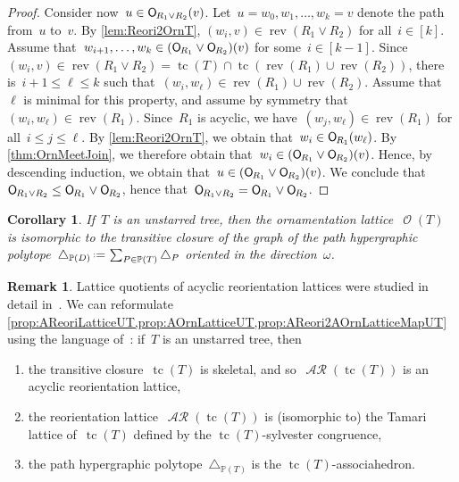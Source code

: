 \documentclass{amsart}
\newtheorem{corollary}[theorem]{Corollary}
\theoremstyle{definition}
\newtheorem{remark}[theorem]{Remark}
\renewcommand{\c}[1]{\mathcal{#1}} %
\newcommand{\eqdef}{\mbox{\,\raisebox{0.2ex}{\scriptsize\ensuremath{\mathrm:}}\ensuremath{=}\,}} %
\newcommand{\simplex}{\triangle} %
\DeclareMathOperator{\tc}{tc} %
\newcommand{\join}{\vee} %
\newcommand{\mymap}[2]{\mathsf{#1}_{\hspace{-.7pt}#2}}
\DeclareMathOperator{\Orn}{\c{O}}  %
\newcommand{\orn}[1]{\mymap{O}{#1}}  %
\DeclareMathOperator{\AReori}{\c{AR}}  %
\DeclareMathOperator{\rev}{rev} %
\newcommand{\PP}{\mathbb P} %
\begin{document}
\begin{proof}
Consider now~$u \in \orn{R_1 \join R_2}(v)$.
Let~$u = w_0, w_1, \dots, w_k = v$ denote the path from~$u$ to~$v$.
By \cref{lem:Reori2OrnT}, $(w_i, v) \in \rev(R_1 \join R_2)$ for all~$i \in [k]$.
Assume that~$w_{i+1}, \dots, w_k \in (\orn{R_1} \join \orn{R_2})(v)$ for some~$i \in [k-1]$.
Since~$(w_i, v) \in \rev(R_1 \join R_2) = \tc(T) \cap \tc(\rev(R_1) \cup \rev(R_2))$, there is~${i+1 \le \ell \le k}$ such that~$(w_i, w_\ell) \in \rev(R_1) \cup \rev(R_2)$.
Assume that~$\ell$ is minimal for this property, and assume by symmetry that~$(w_i, w_\ell) \in \rev(R_1)$.
Since~$R_1$ is acyclic, we have~$(w_j, w_\ell) \in \rev(R_1)$ for all~${i \le j \le \ell}$.
By \cref{lem:Reori2OrnT}, we obtain that~$w_i \in \orn{R_1}(w_\ell)$.
By \cref{thm:OrnMeetJoin}, we therefore obtain that~${w_i \in (\orn{R_1} \join \orn{R_2})(v)}$.
Hence, by descending induction, we obtain that~$u \in (\orn{R_1} \join \orn{R_2})(v)$.
We conclude that~$\orn{R_1 \join R_2} \le \orn{R_1} \join \orn{R_2}$, hence that~${\orn{R_1 \join R_2} = \orn{R_1} \join \orn{R_2}}$.
\end{proof}

\begin{corollary}
If~$T$ is an unstarred tree, then the ornamentation lattice~$\Orn(T)$ is isomorphic to the transitive closure of the graph of the path hypergraphic polytope~$\simplex_{\PP(D)} \eqdef \sum_{P \in \PP(T)} \simplex_P$ oriented in the direction~$\omega$.
\end{corollary}

\begin{remark}
Lattice quotients of acyclic reorientation lattices were studied in detail in~\cite{Pilaud-acyclicReorientationLattices}.
We can reformulate \cref{prop:AReoriLatticeUT,prop:AOrnLatticeUT,prop:AReori2AOrnLatticeMapUT} using the language of~\cite{Pilaud-acyclicReorientationLattices}: if~$T$ is an unstarred tree, then
\begin{enumerate}
\item the transitive closure~$\tc(T)$ is skeletal, and so~$\AReori(\tc(T))$ is an acyclic reorientation lattice,
\item the reorientation lattice~$\AReori(\tc(T))$ is (isomorphic to) the Tamari lattice of~$\tc(T)$ defined by the $\tc(T)$-sylvester congruence,
\item the path hypergraphic polytope~$\simplex_{\PP(T)}$ is the $\tc(T)$-associahedron.
\end{enumerate}
\end{remark}
\end{document}
